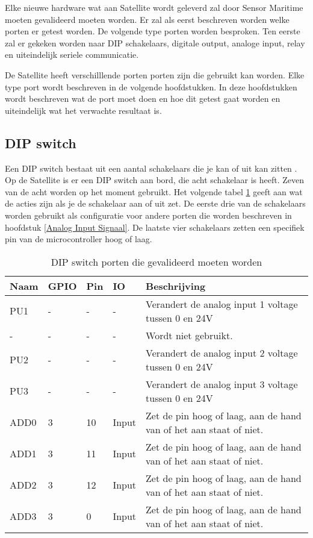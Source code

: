Elke nieuwe hardware wat aan Satellite wordt geleverd zal door Sensor Maritime moeten gevalideerd moeten worden. Er zal als eerst beschreven worden welke porten er getest worden. De volgende type porten worden besproken. Ten eerste zal er gekeken worden naar DIP schakelaars, digitale output, analoge input, relay en uiteindelijk seriele communicatie. \newline

\noindent De Satellite heeft verschilllende porten porten zijn die gebruikt kan worden. Elke type port wordt beschreven in de volgende hoofdstukken. In deze hoofdstukken wordt beschreven wat de port moet doen en hoe dit getest gaat worden en uiteindelijk wat het verwachte resultaat is.

\subsection{DIP switch}
Een DIP switch bestaat uit een aantal schakelaars die je kan of uit kan zitten \autocite{DIP}. Op de Satellite is er een DIP switch aan bord, die acht schakelaar is heeft. Zeven van de acht worden op het moment gebruikt. Het volgende tabel \ref{tab:hw_val_dip} geeft aan wat de acties zijn als je de schakelaar aan of uit zet. De eerste drie van de schakelaars worden gebruikt als configuratie voor andere porten die worden beschreven in hoofdstuk \ref{Analog Input Signaal}. De laatste vier schakelaars zetten een specifiek pin van de microcontroller hoog of laag.
\begin{table}[h!]
	\caption{DIP switch porten die gevalideerd moeten worden}
	\begin{tabular}{llllp{10cm}}
	\toprule
	\textbf{Naam} & \textbf{GPIO} & \textbf{Pin} & \textbf{IO} & \textbf{Beschrijving}	\\ \toprule
	PU1		& -			& - 	& -    		& Verandert de analog input 1 voltage tussen 0 en 24V	\\
	-		& -			& - 	& -    		& Wordt niet gebruikt.								\\
	PU2		& -			& - 	& -    		& Verandert de analog input 2 voltage tussen 0 en 24V	\\
	PU3		& -			& - 	& -    		& Verandert de analog input 3 voltage tussen 0 en 24V	\\
	ADD0 	& 3			& 10	& Input		& Zet de pin hoog of laag, aan de hand van of het aan staat of niet.		\\
	ADD1 	& 3			& 11	& Input		& Zet de pin hoog of laag, aan de hand van of het aan staat of niet.		\\
	ADD2 	& 3			& 12	& Input		& Zet de pin hoog of laag, aan de hand van of het aan staat of niet.		\\
	ADD3 	& 3			& 0 	& Input		& Zet de pin hoog of laag, aan de hand van of het aan staat of niet.		\\ \bottomrule
	\end{tabular}
	\label{tab:hw_val_dip}
\end{table}

